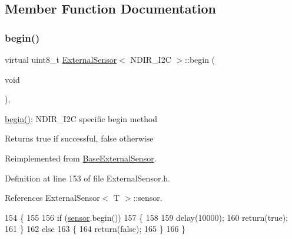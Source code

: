 \subsection{Member Function Documentation}
\mbox{\label{classExternalSensor_3_01NDIR__I2C_01_4_ac6f3614d94968ef0cc11b2b4d69cef03}} 
\subsubsection{\texorpdfstring{begin()}{begin()}}
{\footnotesize\ttfamily virtual uint8\+\_\+t \hyperlink{classExternalSensor}{External\+Sensor}$<$ N\+D\+I\+R\+\_\+\+I2C $>$\+::begin (\begin{DoxyParamCaption}\item[{void}]{ }\end{DoxyParamCaption})\hspace{0.3cm}{\ttfamily [inline]}, {\ttfamily [virtual]}}

\hyperlink{classExternalSensor_3_01NDIR__I2C_01_4_ac6f3614d94968ef0cc11b2b4d69cef03}{begin()}\+: N\+D\+I\+R\+\_\+\+I2C specific begin method

\begin{DoxyReturn}{Returns}
true if successful, false otherwise 
\end{DoxyReturn}


Reimplemented from \hyperlink{classBaseExternalSensor_a87d132803d4f4fdd4e66332809f0c9a0}{Base\+External\+Sensor}.



Definition at line 153 of file External\+Sensor.\+h.



References External\+Sensor$<$ T $>$\+::sensor.


\begin{DoxyCode}
154     \{
155 
156          \textcolor{keywordflow}{if} (\hyperlink{classExternalSensor_3_01NDIR__I2C_01_4_ae541c9cece7c38674b70114cdb74a7dc}{sensor}.begin()) 
157         \{
158 
159             delay(10000);
160             \textcolor{keywordflow}{return}(\textcolor{keyword}{true});
161             \}
162          \textcolor{keywordflow}{else} 
163         \{
164             \textcolor{keywordflow}{return}(\textcolor{keyword}{false});
165         \}   
166     \}
\end{DoxyCode}
\mbox{\label{classExternalSensor_3_01NDIR__I2C_01_4_add67f5ecaf47d2ee675e8299aee7322d}} 
